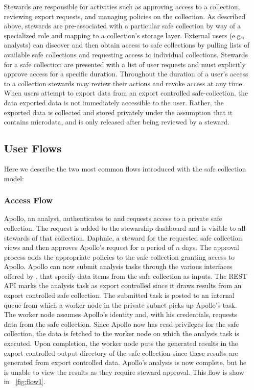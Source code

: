 Stewards are responsible for activities such as approving access to a collection, reviewing
export requests, and managing policies on the collection.
As described above, stewards are pre-associated with a particular safe collection by
way of a specialized role and mapping to a collection's storage layer.
External users (e.g., analysts) can discover
and then obtain access to safe collections by pulling lists of available safe collections and requesting
access to individual collections.
Stewards for a safe collection are presented with a list of user requests and must explicitly approve access
for a specific duration. Throughout the duration of a user's access to a collection
stewards may review their actions and revoke access at any time. When users attempt
to export data from an export controlled safe-collection, the data exported data is not immediately
accessible to the user. Rather, the exported data is collected and stored privately under the assumption that it contains microdata, and is only released after being reviewed by a steward.


\subsection{User Flows}

Here we describe the two most common flows introduced with the safe collection model:

\subsubsection{Access Flow}

Apollo, an analyst, authenticates to \NAME and requests access to a private safe collection.
The request is added to the stewarship dashboard and is visible to all stewards
of that collection. Daphnie, a steward for the requested
safe collection views and then approves Apollo's request for a period of $n$ days.
The approval process adds the appropriate policies to the
safe collection granting access to Apollo. Apollo can now submit analysis tasks through the various
interfaces offered by \NAMENS, that specify data items from the safe collection as inputs.
The REST API marks the analysis task as export controlled since it draws results
from an export controlled safe collection.
The submitted task is posted to an internal queue from which a
worker node in the \NAME private subnet picks up Apollo's task. The worker node assumes Apollo's identity and, with
his credentials, requests data from the safe collection. Since Apollo now has read privileges for the
safe collection, the data is fetched to the worker node on which the analysis task is executed.
Upon completion, the worker node puts the generated results in the export-controlled
output directory of the safe collection since these results are generated from export controlled data.
Apollo's analysis is now complete, but he is unable to view the
results as they require steward approval. This flow is show in \figurename~\ref{fig:flow1}.

